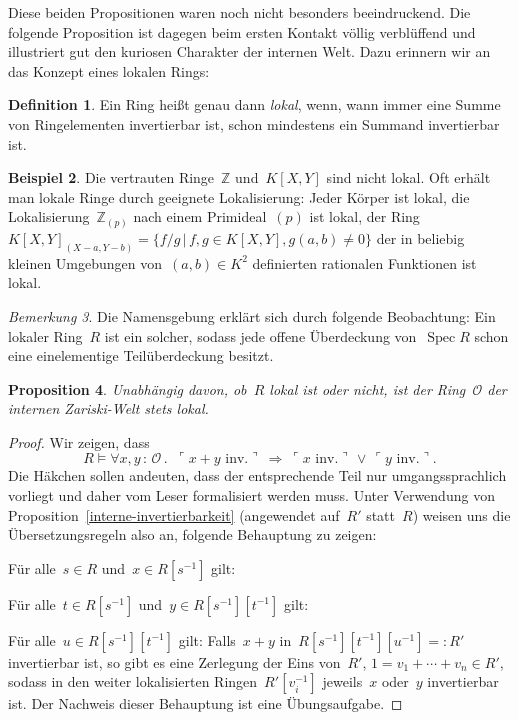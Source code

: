 \documentclass[a4paper,ngerman,12pt]{scrartcl}
\theoremstyle{definition}
\newtheorem{defn}{Definition}[section]
\newtheorem{bsp}[defn]{Beispiel}
\theoremstyle{plain}
\newtheorem{prop}[defn]{Proposition}
\theoremstyle{remark}
\newtheorem{bem}[defn]{Bemerkung}
\newcommand{\ZZ}{\mathbb{Z}}
\renewcommand{\O}{\mathcal{O}}
\DeclareMathOperator{\Spec}{Spec}
\renewcommand{\_}{\mathpunct{.}\,}
\newcommand{\?}{\,{:}\,}
\newcommand{\speak}[1]{\ulcorner\text{#1}\urcorner}
\newenvironment{indentblock}{%
  \list{}{\leftmargin\leftmargin}%
  \item\relax
}{%
  \endlist
}
\begin{document}
Diese beiden Propositionen waren noch nicht besonders beeindruckend.
Die folgende Proposition ist dagegen beim ersten Kontakt völlig verblüffend und
illustriert gut den kuriosen Charakter der internen Welt. Dazu erinnern wir an
das Konzept eines lokalen Rings:
\begin{defn}Ein Ring heißt genau dann \emph{lokal}, wenn, wann immer eine Summe
von Ringelementen invertierbar ist, schon mindestens ein Summand invertierbar
ist.\end{defn}
\begin{bsp}Die vertrauten Ringe~$\ZZ$ und~$K[X,Y]$ sind nicht lokal. Oft erhält
man lokale Ringe durch geeignete Lokalisierung: Jeder Körper ist lokal,
die Lokalisierung~$\ZZ_{(p)}$ nach einem Primideal~$(p)$ ist lokal, der Ring
$K[X,Y]_{(X-a,Y-b)} = \{ f/g \,|\, f,g \in K[X,Y], g(a,b) \neq 0 \}$ der in
beliebig kleinen Umgebungen von~$(a,b) \in K^2$ definierten rationalen
Funktionen ist lokal.
\end{bsp}

\begin{bem}Die Namensgebung erklärt sich durch folgende Beobachtung: Ein
lokaler Ring~$R$ ist ein solcher, sodass jede offene Überdeckung von~$\Spec R$
schon eine einelementige Teilüberdeckung besitzt.\end{bem}

\begin{prop}\label{intern-lokal}%
Unabhängig davon, ob~$R$ lokal ist oder nicht, ist der Ring~$\O$
der internen Zariski-Welt stets lokal.\end{prop}
\begin{proof}
Wir zeigen, dass
\[ R \models \forall x,y\?\O\_\ \speak{$x+y$ inv.}\ \Longrightarrow\ 
  \speak{$x$ inv.} \,\vee\, \speak{$y$ inv.}. \]
Die Häkchen sollen andeuten, dass der entsprechende Teil nur umgangssprachlich
vorliegt und daher vom Leser formalisiert werden muss. Unter Verwendung von
Proposition~\ref{interne-invertierbarkeit} (angewendet auf~$R'$
statt~$R$) weisen uns die
Übersetzungsregeln also an, folgende Behauptung zu zeigen:
\begin{indentblock}
Für alle~$s \in R$ und~$x \in R[s^{-1}]$ gilt:
\begin{indentblock}
Für alle~$t \in R[s^{-1}]$ und~$y \in R[s^{-1}][t^{-1}]$ gilt:
\begin{indentblock}
Für alle~$u \in R[s^{-1}][t^{-1}]$ gilt: Falls~$x+y$ in~$R[s^{-1}][t^{-1}][u^{-1}] =: R'$
invertierbar ist, so gibt es eine Zerlegung der Eins von~$R'$, $1 = v_1 +
\cdots + v_n \in R'$, sodass in den
weiter lokalisierten Ringen~$R'[v_i^{-1}]$ jeweils~$x$ oder~$y$ invertierbar
ist.
\end{indentblock}
\end{indentblock}
\end{indentblock}
Der Nachweis dieser Behauptung ist eine Übungsaufgabe.
\end{proof}
\end{document}
